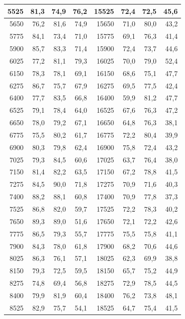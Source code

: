 \begin{small}
\begin{longtable}{|r|r|r|r|r|r|r|r|}
5525 & 81,3 & 74,9 & 76,2 & 15525 & 72,4 & 72,5 & 45,6 \\ \hline
5650 & 76,2 & 81,6 & 74,9 & 15650 & 71,0 & 80,0 & 43,2 \\ \hline
5775 & 84,1 & 73,4 & 71,0 & 15775 & 69,1 & 76,3 & 41,4 \\ \hline
5900 & 85,7 & 83,3 & 71,4 & 15900 & 72,4 & 73,7 & 44,6 \\ \hline
6025 & 77,2 & 81,1 & 79,3 & 16025 & 70,0 & 79,0 & 52,4 \\ \hline
6150 & 78,3 & 78,1 & 69,1 & 16150 & 68,6 & 75,1 & 47,7 \\ \hline
6275 & 86,7 & 75,7 & 67,9 & 16275 & 69,5 & 77,5 & 42,4 \\ \hline
6400 & 77,7 & 83,5 & 66,8 & 16400 & 59,9 & 81,2 & 47,7 \\ \hline
6525 & 79,1 & 78,4 & 64,0 & 16525 & 67,6 & 76,3 & 47,2 \\ \hline
6650 & 78,0 & 79,2 & 67,1 & 16650 & 64,8 & 76,3 & 38,1 \\ \hline
6775 & 75,5 & 80,2 & 61,7 & 16775 & 72,2 & 80,4 & 39,9 \\ \hline
6900 & 80,3 & 79,8 & 62,4 & 16900 & 75,8 & 72,4 & 43,2 \\ \hline
7025 & 79,3 & 84,5 & 60,6 & 17025 & 63,7 & 76,4 & 38,0 \\ \hline
7150 & 81,4 & 82,2 & 63,5 & 17150 & 67,2 & 78,8 & 41,5 \\ \hline
7275 & 84,5 & 90,0 & 71,8 & 17275 & 70,9 & 71,6 & 40,3 \\ \hline
7400 & 88,2 & 88,1 & 60,8 & 17400 & 70,9 & 77,8 & 37,3 \\ \hline
7525 & 86,8 & 82,0 & 59,7 & 17525 & 72,2 & 78,3 & 40,2 \\ \hline
7650 & 89,3 & 89,0 & 51,6 & 17650 & 72,1 & 72,2 & 42,6 \\ \hline
7775 & 86,5 & 79,3 & 55,7 & 17775 & 75,5 & 75,8 & 41,1 \\ \hline
7900 & 84,3 & 78,0 & 61,8 & 17900 & 68,2 & 70,6 & 44,6 \\ \hline
8025 & 86,3 & 76,1 & 57,1 & 18025 & 62,3 & 69,9 & 38,8 \\ \hline
8150 & 79,3 & 72,5 & 59,5 & 18150 & 65,7 & 75,2 & 44,9 \\ \hline
8275 & 74,8 & 69,4 & 56,8 & 18275 & 72,9 & 78,5 & 44,5 \\ \hline
8400 & 79,9 & 81,9 & 60,4 & 18400 & 76,2 & 73,8 & 48,1 \\ \hline
8525 & 82,9 & 75,7 & 54,1 & 18525 & 64,7 & 75,4 & 41,5 \\ \hline

\end{longtable}
\end{small}
